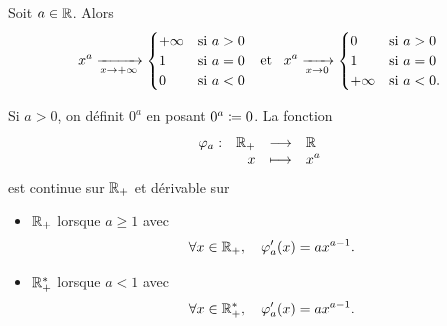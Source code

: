 \documentclass{magnoliaold}
\begin{document}


\begin{proposition}[utile=-3]
Soit $a\in\mathbb{R}$. Alors
\[x^a \xrightarrow[x\rightarrow +\infty]{}
  \begin{cases}
  +\infty & \text{si $a>0$}\\
  1 & \text{si $a=0$}\\
  0 & \text{si $a<0$}
  \end{cases} \quad\!\text{et}\quad\!
  x^a \xrightarrow[x\rightarrow 0]{}
  \begin{cases}
  0 & \text{si $a>0$}\\
  1 & \text{si $a=0$}\\
  +\infty & \text{si $a<0$.}
  \end{cases}\]
\end{proposition}


\begin{remarqueUnique}
\remarque Si $a>0$, on définit $0^a$ en posant $0^a\coloneqq 0$. La fonction
  \[\begin{array}[t]{lrcl} \displaystyle{\varphi_a} : & \displaystyle{\mathbb{R}_+} & \longrightarrow & \displaystyle{\mathbb{R}} \\ & \displaystyle{x} & \longmapsto & \displaystyle{x^a} \end{array}\]
  est continue sur $\mathbb{R}_+$ et dérivable sur
  \begin{itemize}
  \item $\mathbb{R}_+$ lorsque $a\geq 1$ avec
    \[\forall x\in\mathbb{R}_+ ,\quad \varphi_a'(x)=a x^{a-1}.\]
  \item $\mathbb{R}_+^*$ lorsque $a<1$ avec
    \[\forall x\in\mathbb{R}_+^* ,\quad \varphi_a'(x)=a x^{a-1}.\]
  \end{itemize}
\end{remarqueUnique}
\end{document}
